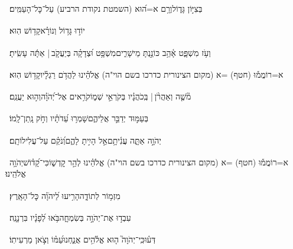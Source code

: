 \documentclass[12pt]{article}
\newcommand{\loc}[1]{\textsuperscript{\locf{#1}}}
\begin{document}
{\loc{ ב}~}‏ בְּצִיּ֣וֹן גָּד֑וֹל{\hfill}וְרָ֥ם א=ה֝וּא (השמטת נקודת הרביע) עַל־כׇּל־הָעַמִּֽים׃\par

{\loc{ ג}~}‏יוֹד֣וּ  גָּד֥וֹל וְנוֹרָ֗א{\hfill}קָד֥וֹשׁ הֽוּא׃\par

{\loc{ ד}~}‏וְעֹ֥ז {\hfill}מִשְׁפָּ֢ט אָ֫הֵ֥ב\newline\hspace*{.5em} כּוֹנַ֣נְתָּ מֵישָׁרִ֑ים{\hfill}מִשְׁפָּ֥ט וּ֝צְדָקָ֗ה בְּיַעֲקֹ֤ב |  אַתָּ֬ה עָשִֽׂיתָ׃\par

{\loc{ ה}~}‏א=רוֹמֲמ֡וּ (חטף) =א (מקום הצינורית כדרכו בשם הוי"ה) אֱלֹהֵ֗ינוּ{\hfill} לַהֲדֹ֥ם רַגְלָ֗יו{\hfill}קָד֥וֹשׁ הֽוּא׃\par

{\loc{ ו}~}‏מֹ֘שֶׁ֤ה וְאַהֲרֹ֨ן |  בְּֽכֹהֲנָ֗יו{\hfill} בְּקֹרְאֵ֣י שְׁמ֑וֹ\newline\hspace*{.5em}קֹרִ֥אים אֶל־יְ֝הֹוָ֗ה{\hfill}וְה֣וּא יַעֲנֵֽם׃\par

{\loc{ ז}~}‏בְּעַמּ֣וּד  יְדַבֵּ֣ר אֲלֵיהֶ֑ם{\hfill}שָׁמְר֥וּ עֵ֝דֹתָ֗יו וְחֹ֣ק נָֽתַן־לָֽמוֹ׃\par

{\loc{ ח}~}‏יְהֹוָ֣ה {\hfill}אַתָּ֢ה עֲנִ֫יתָ֥ם\newline\hspace*{.5em}אֵ֣ל  הָיִ֣יתָ לָהֶ֑ם{\hfill}וְ֝נֹקֵ֗ם עַל־עֲלִילוֹתָֽם׃\par

{\loc{ ט}~}‏א=רוֹמֲמ֡וּ (חטף) =א (מקום הצינורית כדרכו בשם הוי"ה) אֱלֹהֵ֗ינוּ{\hfill} לְהַ֣ר קׇדְשׁ֑וֹ\newline\hspace*{.5em}כִּי־קָ֝ד֗וֹשׁ{\hfill}יְהֹוָ֥ה אֱלֹהֵֽינוּ׃\par\pend

\pstart[\subsection*{\textcolor{red}{פרק ק}}]\label{פרק ק}
{\loc{ א}~}‏מִזְמ֥וֹר לְתוֹדָ֑ה{\hfill}הָרִ֥יעוּ לַ֝יהֹוָ֗ה כׇּל־הָאָֽרֶץ׃\par

{\loc{ ב}~}‏עִבְד֣וּ אֶת־יְהֹוָ֣ה בְּשִׂמְחָ֑ה{\hfill}בֹּ֥אוּ לְ֝פָנָ֗יו בִּרְנָנָֽה׃\par

{\loc{ ג}~}‏דְּע֗וּ{\hfill}כִּֽי־יְהֹוָה֮ ה֤וּא אֱלֹ֫הִ֥ים\newline\hspace*{.5em}  אֲנַ֑חְנוּ{\hfill}עַ֝מּ֗וֹ וְצֹ֣אן מַרְעִיתֽוֹ׃\par
\end{document}
